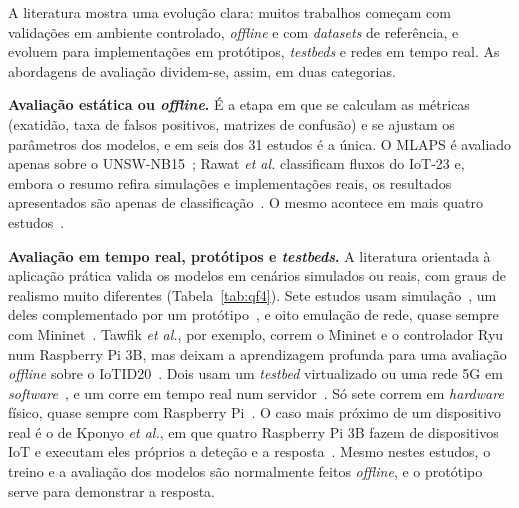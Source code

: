 \documentclass[conference,a4paper]{IEEEtran}
\begin{document}
A literatura mostra uma evolução clara: muitos trabalhos começam com validações em
ambiente controlado, \textit{offline} e com \textit{datasets} de referência, e evoluem
para implementações em protótipos, \textit{testbeds} e redes em tempo real. As abordagens
de avaliação dividem-se, assim, em duas categorias.

\textbf{Avaliação estática ou \textit{offline}.} É a etapa em que se calculam as
métricas (exatidão, taxa de falsos positivos, matrizes de confusão) e se ajustam os
parâmetros dos modelos, e em seis dos 31 estudos é a única. O MLAPS é avaliado apenas sobre o
UNSW-NB15~\cite{saurabh2022mlaps}; Rawat \textit{et al.} classificam fluxos do IoT-23 e,
embora o resumo refira simulações e implementações reais, os resultados apresentados são
apenas de classificação~\cite{rawat2024intelligent}. O mesmo acontece em mais
quatro estudos~\cite{hussain2026postquantum,kumar2025advanced,Arulkumar2026,Chaudhary2025}.

\textbf{Avaliação em tempo real, protótipos e \textit{testbeds}.} A literatura orientada
à aplicação prática valida os modelos em cenários simulados ou reais, com graus de
realismo muito diferentes (Tabela~\ref{tab:qf4}). Sete estudos usam
simulação~\cite{ibrahim2026purechain,shukla2026cyber,verma2024petrak,premakumari2025qlearning,hunde2026rankshield,karibandi2025cyberdome,Rasheed2026},
um deles complementado por um protótipo~\cite{karibandi2025cyberdome},
e oito emulação de rede, quase sempre com
Mininet~\cite{ramirezmartinez2025p4,elsayed2024mpguard,zolotukhin2021curious,tawfik2021internet,toony2024multiblock,gowtham2026fedmp,mazhar2022ridps,tariq2025saegru}.
Tawfik \textit{et al.}, por exemplo, correm o Mininet e o controlador Ryu num Raspberry
Pi 3B, mas deixam a aprendizagem profunda para uma avaliação \textit{offline} sobre o
IoTID20~\cite{tawfik2021internet}. Dois usam um \textit{testbed} virtualizado ou uma rede
5G em \textit{software}~\cite{rose2022ideres,andrade2024ddos}, e um corre em tempo real
num servidor~\cite{Abdulwahid2025}. Só sete correm em \textit{hardware} físico, quase
sempre com Raspberry
Pi~\cite{ravi2020semisupervised,dange2025dual,kponyo2020lightweight,karam2025isaaf,srilekha2025hybrid,garba2024sdn,Iqbal2026}.
O caso mais próximo de um dispositivo real é o de Kponyo \textit{et al.}, em que quatro
Raspberry Pi 3B fazem de dispositivos IoT e executam eles próprios a deteção e a
resposta~\cite{kponyo2020lightweight}. Mesmo nestes estudos, o treino e a avaliação dos
modelos são normalmente feitos \textit{offline}, e o protótipo serve para demonstrar a
resposta.
\end{document}
